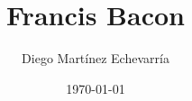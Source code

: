 \documentclass{beamer}
\begin{document}
\title{Francis Bacon}   
\author{Diego Martínez Echevarría} 
\date{\today} 

\frame{\titlepage} 


\end{document}
